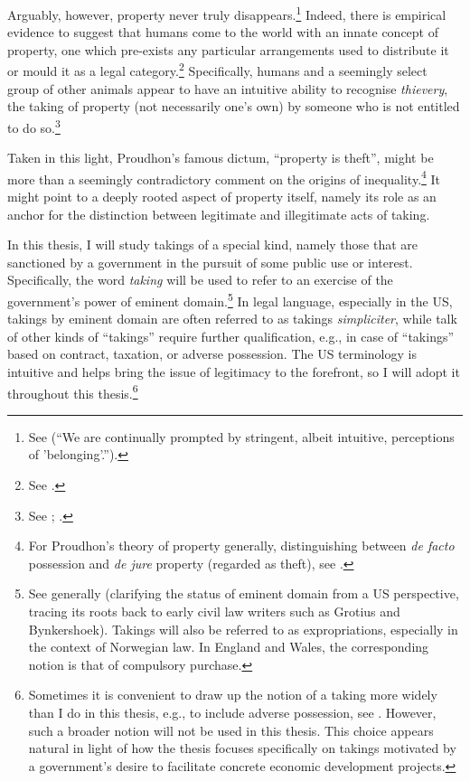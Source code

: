 Arguably, however, property never truly disappears.\footnote{See \cite[159]{gray94} (``We are continually prompted by stringent, albeit intuitive, perceptions of 'belonging'.'').} Indeed, there is empirical evidence to suggest that humans come to the world with an innate concept of property, one which pre-exists any particular arrangements used to distribute it or mould it as a legal category.\footnote{See \cite{stake06}.} Specifically, humans and a seemingly select group of other animals appear to have an intuitive ability to recognise {\it thievery}, the taking of property (not necessarily one's own) by someone who is not entitled to do so.\footnote{See \cite[11-13]{brosnan11}; \cite[159]{gray94}.}


Taken in this light, Proudhon's famous dictum, ``property is theft'', might be more than a seemingly contradictory comment on the origins of inequality.\footnote{For Proudhon's theory of property generally, distinguishing between {\it de facto} possession and {\it de jure} property (regarded as theft), see \cite{strong14}.} It might point to a deeply rooted aspect of property itself, namely its role as an anchor for the distinction between legitimate and illegitimate acts of taking.


In this thesis, I will study takings of a special kind, namely those that are sanctioned by a government in the pursuit of some public use or interest. Specifically, the word {\it taking} will be used to refer to an exercise of the government's power of eminent domain.\footnote{See generally \cite{stoebuck72} (clarifying the status of eminent domain from a US perspective, tracing its roots back to early civil law writers such as Grotius and Bynkershoek). Takings will also be referred to as expropriations, especially in the context of Norwegian law. In England and Wales, the corresponding notion is that of compulsory purchase.} In legal language, especially in the US, takings by eminent domain are often referred to as takings {\it simpliciter}, while talk of other kinds of ``takings'' require further qualification, e.g., in case of ``takings'' based on contract, taxation, or adverse possession. The US terminology is intuitive and helps bring the issue of legitimacy to the forefront, so I will adopt it throughout this thesis.\footnote{Sometimes it is convenient to draw up the notion of a taking more widely than I do in this thesis, e.g., to include adverse possession, see \cite[19-21]{waring09}. However, such a broader notion will not be used in this thesis. This choice appears natural in light of how the thesis focuses specifically on takings motivated by a government's desire to facilitate concrete economic development projects.}

